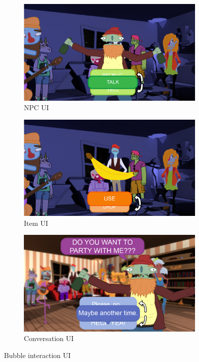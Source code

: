\begin{figure}[htb]
  \centering\begin{subfigure}{.33\textwidth}
    \centering
    \includegraphics[width=.9\linewidth]{images/UI_npc_talk}
    \caption{NPC UI}
  	\label{fig:UI_npc_talk}
  \end{subfigure}%
  \begin{subfigure}{.33\textwidth}
    \centering
    \includegraphics[width=.9\linewidth]{images/UI_item}
    \caption{Item UI}
  	\label{fig:UI_item}
  \end{subfigure}
  \begin{subfigure}{.33\textwidth}
    \centering
    \includegraphics[width=.9\linewidth]{images/UI_npc_conversation}
    \caption{Conversation UI}
  	\label{fig:UI_npc_conversation}
  \end{subfigure}%
  \caption{Bubble interaction UI}
  \label{fig:gameplay_UI}
\end{figure}